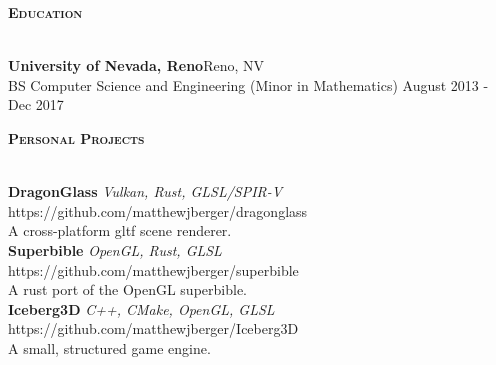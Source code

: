 \documentclass[a4paper]{article}
\newcommand{\lineunder} {
    \vspace*{-8pt} \\
    \hspace*{-18pt} \hrulefill \\
}
\newcommand{\header} [1] {
    {\hspace*{-18pt}\vspace*{6pt} \large \textbf{\textsc{#1}}}
    \vspace*{-6pt} \lineunder
    \vspace*{4pt}
}
\begin{document}
\header{Education}
\textbf{University of Nevada, Reno}\hfill Reno, NV\\
BS Computer Science and Engineering (Minor in Mathematics) \hfill August 2013 - Dec 2017\\
\vspace{2mm}

\header{Personal Projects}
{\textbf{DragonGlass}} {\sl Vulkan, Rust, GLSL/SPIR-V} \hfill https://github.com/matthewjberger/dragonglass\\
A cross-platform gltf scene renderer.\\
\vspace*{2mm}
{\textbf{Superbible}} {\sl OpenGL, Rust, GLSL} \hfill https://github.com/matthewjberger/superbible\\
A rust port of the OpenGL superbible.\\
\vspace*{2mm}
{\textbf{Iceberg3D}} {\sl C++, CMake, OpenGL, GLSL} \hfill https://github.com/matthewjberger/Iceberg3D\\
A small, structured game engine.\\
\vspace*{2mm}
\end{document}
